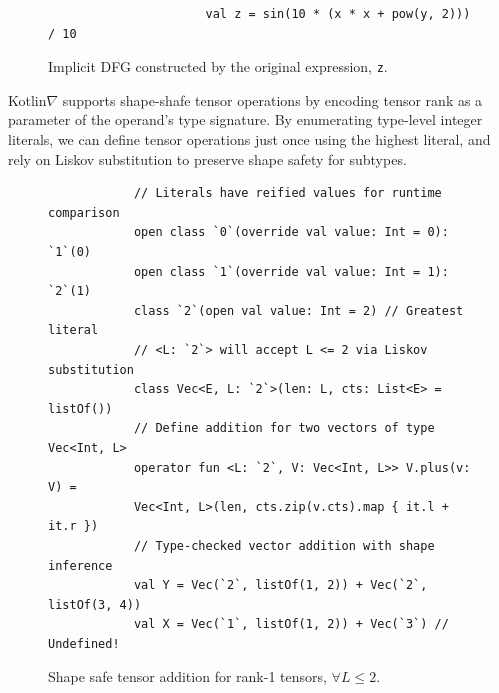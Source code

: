 \documentclass{article}
\newcommand{\squeezeup}{\vspace{-2.5mm}}
\begin{document}
    \squeezeup\begin{figure}[!htb]
                  \begin{verbatim}
                      val z = sin(10 * (x * x + pow(y, 2))) / 10
                  \end{verbatim}
                  \squeezeup\centering
                  \squeezeup\squeezeup\squeezeup\caption{Implicit DFG constructed by the original expression, \texttt{z}.}
    \end{figure}

    \squeezeup Kotlin$\nabla$ supports shape-shafe tensor operations by encoding tensor rank as a parameter of the operand's type signature. By enumerating type-level integer literals, we can define tensor operations just once using the highest literal, and rely on Liskov substitution to preserve shape safety for subtypes.

    \begin{figure}[!htb]
        \begin{verbatim}
            // Literals have reified values for runtime comparison
            open class `0`(override val value: Int = 0): `1`(0)
            open class `1`(override val value: Int = 1): `2`(1)
            class `2`(open val value: Int = 2) // Greatest literal
            // <L: `2`> will accept L <= 2 via Liskov substitution
            class Vec<E, L: `2`>(len: L, cts: List<E> = listOf())
            // Define addition for two vectors of type Vec<Int, L>
            operator fun <L: `2`, V: Vec<Int, L>> V.plus(v: V) =
            Vec<Int, L>(len, cts.zip(v.cts).map { it.l + it.r })
            // Type-checked vector addition with shape inference
            val Y = Vec(`2`, listOf(1, 2)) + Vec(`2`, listOf(3, 4))
            val X = Vec(`1`, listOf(1, 2)) + Vec(`3`) // Undefined!
        \end{verbatim}
        \squeezeup\squeezeup\caption{Shape safe tensor addition for rank-1 tensors, $\forall L\leq2.$}\squeezeup
    \end{figure}
\end{document}
